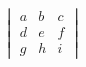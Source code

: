 \documentclass[preview]{standalone}
\begin{document}
\begin{align*}
\begin{vmatrix} a & b & c \\ d & e & f \\ g & h & i \end{vmatrix}
\end{align*}
\end{document}
